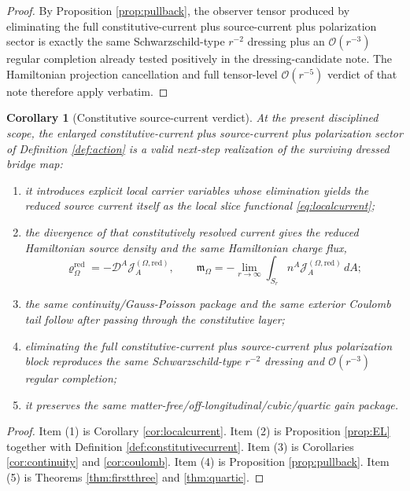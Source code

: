 \documentclass[11pt]{article}
\newcommand{\SpatialD}{\mathcal D}
\newcommand{\SourceDensityRed}{\varrho_\Omega^{\mathrm{red}}}
\newcommand{\SourceCurrentRed}{\mathcal J^{(\Omega,\mathrm{red})}}
\newcommand{\HamChargeOmega}{\mathfrak m_\Omega}
\newtheorem{corollary}{Corollary}
\begin{document}
\begin{proof}
By Proposition \ref{prop:pullback}, the observer tensor produced by eliminating the full constitutive-current plus source-current plus polarization sector is exactly the same Schwarzschild-type \(r^{-2}\) dressing plus an \(\mathcal O(r^{-3})\) regular completion already tested positively in the dressing-candidate note. The Hamiltonian projection cancellation and full tensor-level \(\mathcal O(r^{-5})\) verdict of that note therefore apply verbatim.
\end{proof}

\begin{corollary}[Constitutive source-current verdict]
\label{cor:verdict}
At the present disciplined scope, the enlarged constitutive-current plus source-current plus polarization sector of Definition \ref{def:action} is a valid next-step realization of the surviving dressed bridge map:
\begin{enumerate}
    \item it introduces explicit local carrier variables whose elimination yields the reduced source current itself as the local slice functional \eqref{eq:localcurrent};
    \item the divergence of that constitutively resolved current gives the reduced Hamiltonian source density and the same Hamiltonian charge flux,
    \[
    \SourceDensityRed=-\SpatialD^A\SourceCurrentRed_A,
    \qquad
    \HamChargeOmega=-\lim_{r\to\infty}\int_{S_r}n^A\SourceCurrentRed_A\,dA;
    \]
    \item the same continuity/Gauss-Poisson package and the same exterior Coulomb tail follow after passing through the constitutive layer;
    \item eliminating the full constitutive-current plus source-current plus polarization block reproduces the same Schwarzschild-type \(r^{-2}\) dressing and \(\mathcal O(r^{-3})\) regular completion;
    \item it preserves the same matter-free/off-longitudinal/cubic/quartic gain package.
\end{enumerate}
\end{corollary}

\begin{proof}
Item (1) is Corollary \ref{cor:localcurrent}. Item (2) is Proposition \ref{prop:EL} together with Definition \ref{def:constitutivecurrent}. Item (3) is Corollaries \ref{cor:continuity} and \ref{cor:coulomb}. Item (4) is Proposition \ref{prop:pullback}. Item (5) is Theorems \ref{thm:firstthree} and \ref{thm:quartic}.
\end{proof}
\end{document}
